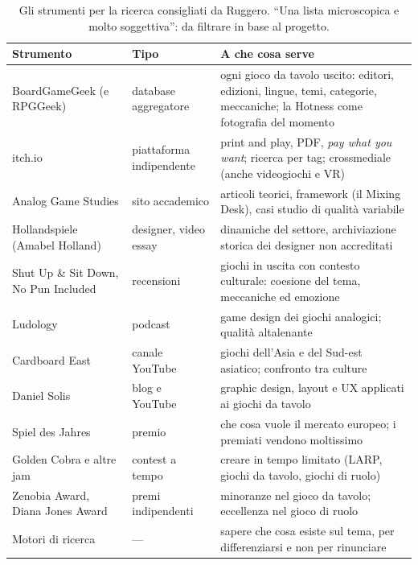 \begin{table}[htbp]
\centering
\small
\begin{tabular}{@{}p{3.2cm}p{3.0cm}p{6.8cm}@{}}
\toprule
\textbf{Strumento} & \textbf{Tipo} & \textbf{A che cosa serve} \\
\midrule
BoardGameGeek (e RPGGeek) & database aggregatore & ogni gioco da tavolo uscito:
editori, edizioni, lingue, temi, categorie, meccaniche; la Hotness come fotografia
del momento \\
itch.io & piattaforma indipendente & print and play, PDF, \emph{pay what you want};
ricerca per tag; crossmediale (anche videogiochi e VR) \\
Analog Game Studies & sito accademico & articoli teorici, framework (il Mixing Desk),
casi studio di qualità variabile \\
Hollandspiele (Amabel Holland) & designer, video essay & dinamiche del settore,
archiviazione storica dei designer non accreditati \\
Shut Up \& Sit Down, No Pun Included & recensioni & giochi in uscita con contesto
culturale: coesione del tema, meccaniche ed emozione \\
Ludology & podcast & game design dei giochi analogici; qualità altalenante \\
Cardboard East & canale YouTube & giochi dell'Asia e del Sud-est asiatico; confronto
tra culture \\
Daniel Solis & blog e YouTube & graphic design, layout e UX applicati ai giochi da
tavolo \\
Spiel des Jahres & premio & che cosa vuole il mercato europeo; i premiati vendono
moltissimo \\
Golden Cobra e altre jam & contest a tempo & creare in tempo limitato (LARP, giochi da
tavolo, giochi di ruolo) \\
Zenobia Award, Diana Jones Award & premi indipendenti & minoranze nel gioco da
tavolo; eccellenza nel gioco di ruolo \\
Motori di ricerca & --- & sapere che cosa esiste sul tema, per differenziarsi e non
per rinunciare \\
\bottomrule
\end{tabular}
\caption{Gli strumenti per la ricerca consigliati da Ruggero. ``Una lista microscopica
e molto soggettiva'': da filtrare in base al progetto.}
\label{a6:tab:strumenti}
\end{table}

